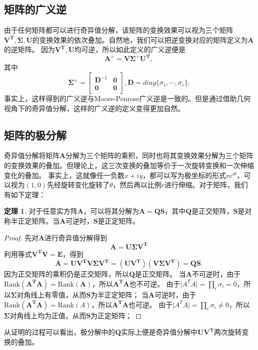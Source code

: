 \documentclass[12pt, a4paper, oneside]{ctexart}
\theoremstyle{remark}
\theoremstyle{definition}
\newtheorem{theorem}{定理}[section]
\theoremstyle{definition}
\theoremstyle{plain}
\begin{document}
\subsection{矩阵的广义逆}
由于任何矩阵都可以进行奇异值分解，该矩阵的变换效果可以视为三个矩阵$\bm{V^T},\bm{\Sigma},\bm{U}$的变换效果的依次叠加。自然地，我们可以把逆变换对应的矩阵定义为$\bm{A}$的逆矩阵。
因为$\bm{V^T},\bm{U}$均可逆，所以如此定义的广义逆便是
\[\bm{A}^+=\bm{V}\bm{\Sigma^{+}U^T},\]
其中
\[\bm{\Sigma^{+}}=\begin{bmatrix}
    \bm{D}^{-1}&\bm{0}\\
    \bm{0}&\bm{0}
\end{bmatrix},\bm{D}=diag\{\sigma_1,\cdots,\sigma_r\}.\]
事实上，这样得到的广义逆与Moore-Penrose广义逆是一致的。但是通过借助几何视角下的奇异值分解，这样的广义逆的定义变得更加自然。
\subsection{矩阵的极分解}
奇异值分解将矩阵$\bm{A}$分解为三个矩阵的乘积，同时也将其变换效果分解为三个矩阵的变换效果的叠加。但理论上，这三次变换的叠加等价于一次旋转变换和一次伸缩变化的叠加。
事实上，这就像任一负数$x+iy$，都可以写为极坐标的形式$re^{i\theta}$，可以视为$(1,0)$先经旋转变化旋转了$\theta$，然后再以比例$r$进行伸缩。对于矩阵，我们有如下定理：
\begin{theorem}
    对于任意实方阵$\bm{A}$，可以将其分解为$\bm{A}=\bm{QS}$，其中$\bm{Q}$是正交矩阵，$\bm{S}$是对称半正定矩阵。当$\bm{A}$可逆时，$\bm{S}$是正定矩阵。
\end{theorem}
\begin{proof}
    先对$\bm{A}$进行奇异值分解得到
    \[\bm{A}=\bm{U\Sigma V^T}\]
    利用等式$\bm{V^TV}=\bm{E}$，得到
    \[\bm{A}=\bm{UV^TV\Sigma V^T}=(\bm{UV^T})(\bm{V\Sigma V^T})=\bm{Q}\bm{S}.\]
    因为正交矩阵的乘积仍是正交矩阵，所以$\bm{Q}$是正交矩阵。
    当$\bm{A}$不可逆时，由于$\text{Rank}(\bm{A^TA})=\text{Rank}(\bm{A})$，所以$\bm{A^TA}$也不可逆。
     由于$\lvert A^TA\rvert=\prod_i\sigma_i= 0$，所以$\bm{\Sigma}$对角线上有零值，从而$\bm{S}$为半正定矩阵；
    当$\bm{A}$可逆时，由于$\text{Rank}(\bm{A^TA})=\text{Rank}(A)$，所以$\bm{A^TA}$也可逆。
     由于$\lvert A^TA\rvert=\prod_i\sigma_i\neq 0$，所以$\bm{\Sigma}$对角线上均为正值，从而$\bm{S}$为正定矩阵；
\end{proof}
从证明的过程可以看出，极分解中的$\bm{Q}$实际上便是奇异值分解中$\bm{U}\bm{V^T}$两次旋转变换的叠加。
\end{document}
